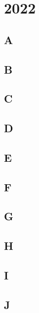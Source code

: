 \section{2022}
\subsection{A}
\raggedbottom
\hrulefill
\subsection{B}
\raggedbottom
\hrulefill
\subsection{C}
\raggedbottom
\hrulefill
\subsection{D}
\raggedbottom
\hrulefill
\subsection{E}
\raggedbottom
\hrulefill
\subsection{F}
\raggedbottom
\hrulefill
\subsection{G}
\raggedbottom
\hrulefill
\subsection{H}
\raggedbottom
\hrulefill
\subsection{I}
\raggedbottom
\hrulefill
\subsection{J}
\raggedbottom
\hrulefill
